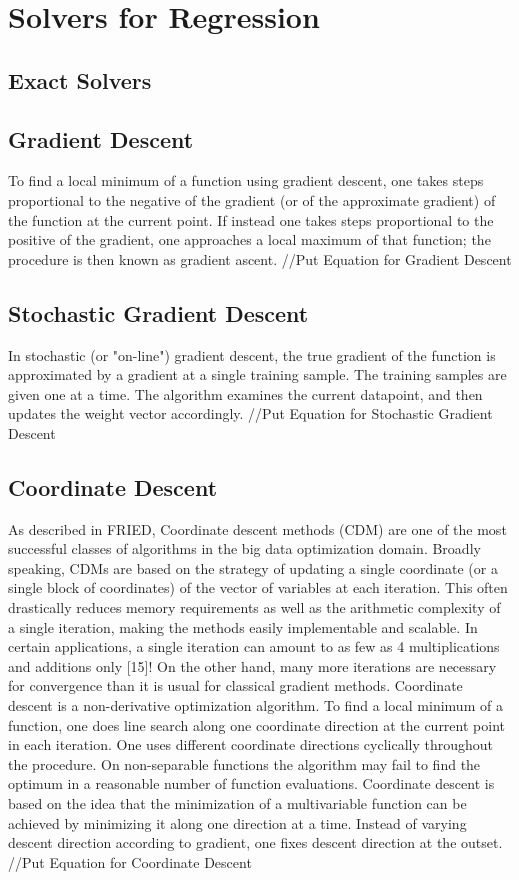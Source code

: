 \documentclass{sigplanconf}
\begin{document}
\section{Solvers for Regression}
\subsection{Exact Solvers}

\subsection{Gradient Descent}
To find a local minimum of a function using gradient descent, one takes steps proportional to the negative of 
the gradient (or of the approximate gradient) of the function at the current point. If instead one takes steps 
proportional to the positive of the gradient, one approaches a local maximum of that function; 
the procedure is then known as gradient ascent.
//Put Equation for Gradient Descent

\subsection{Stochastic Gradient Descent}
In stochastic (or "on-line") gradient descent, the true gradient of the function is approximated by a gradient at a
single training sample. The training samples are given one at a time. The algorithm examines the
current datapoint, and then updates the weight vector accordingly.
//Put Equation for Stochastic Gradient Descent

\subsection{Coordinate Descent}
As described in FRIED, Coordinate descent methods (CDM) are one of the most successful classes of algorithms in the big data optimization domain. 
Broadly speaking, CDMs are based on the strategy of updating a single coordinate (or a single block of coordinates) of the vector
of variables at each iteration. This often drastically reduces memory requirements as well as the
arithmetic complexity of a single iteration, making the methods easily implementable and scalable.
In certain applications, a single iteration can amount to as few as 4 multiplications and additions
only [15]! On the other hand, many more iterations are necessary for convergence than it is usual
for classical gradient methods.
Coordinate descent is a non-derivative optimization algorithm. To find a local minimum of a function, one does line 
search along one coordinate direction at the current point in each iteration. One uses different coordinate directions 
cyclically throughout the procedure. On non-separable functions the algorithm may fail to find the optimum in a reasonable 
number of function evaluations. Coordinate descent is based on the idea that the minimization of a multivariable function can be
achieved by minimizing it along one direction at a time. Instead of varying descent direction according
to gradient, one fixes descent direction at the outset.
//Put Equation for Coordinate Descent
\end{document}
